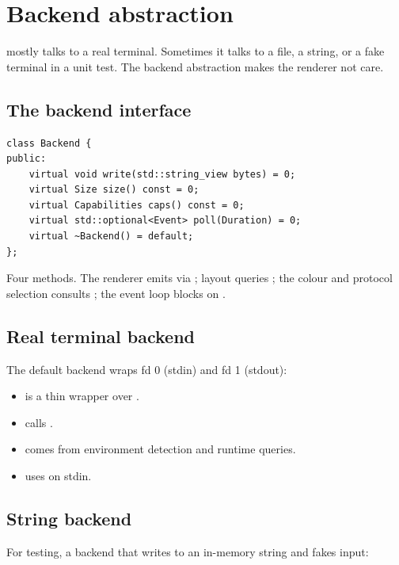 \chapter{Backend abstraction}
\label{ch:backend}

\begin{aside}
\maya{} mostly talks to a real terminal. Sometimes it talks to a
file, a string, or a fake terminal in a unit test. The backend
abstraction makes the renderer not care.
\end{aside}

\section{The backend interface}

\begin{lstlisting}
class Backend {
public:
    virtual void write(std::string_view bytes) = 0;
    virtual Size size() const = 0;
    virtual Capabilities caps() const = 0;
    virtual std::optional<Event> poll(Duration) = 0;
    virtual ~Backend() = default;
};
\end{lstlisting}

Four methods. The renderer emits via ; layout queries
; the colour and protocol selection consults
; the event loop blocks on .

\section{Real terminal backend}

The default backend wraps fd 0 (stdin) and fd 1 (stdout):

\begin{itemize}[leftmargin=*]
  \item {} is a thin wrapper over .
  \item {} calls .
  \item {} comes from environment detection and
    runtime queries.
  \item {} uses  on stdin.
\end{itemize}

\section{String backend}

For testing, a backend that writes to an in-memory string and
fakes input:

